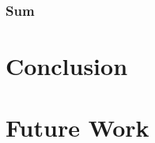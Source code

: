\documentclass[a4paper,11pt,titlepage]{report}
\begin{document}
\subsection{Sum}


\newpage
\chapter{Conclusion}

\newpage
\chapter{Future Work}

\newpage
{}

\printbibliography
\end{document}
